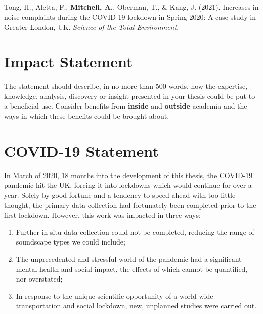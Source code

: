 \documentclass[twoside,fontsize=12pt,titlepage,chapterprefix=true
]{scrbook}
\begin{document}
\paragraph*{}Tong, H., Aletta, F., \textbf{Mitchell, A.}, Oberman, T., \& Kang, J. (2021). Increases in noise complaints during the COVID-19 lockdown in Spring 2020: A case study in Greater London, UK. \emph{Science of the Total Environment}.









\chapter*{Impact Statement}
The statement should describe, in no more than 500 words, how the expertise, knowledge, analysis, discovery or insight presented in your thesis could be put to a beneficial use. Consider benefits from \textbf{inside} and \textbf{outside} academia and the ways in which these benefits could be brought about.

\chapter*{COVID-19 Statement}

In March of 2020, 18 months into the development of this thesis, the COVID-19 pandemic hit the UK, forcing it into lockdowns which would continue for over a year. Solely by good fortune and a tendency to speed ahead with too-little thought, the primary data collection had fortunately been completed prior to the first lockdown. However, this work was impacted in three ways:

\begin{enumerate}
      \item Further in-situ data collection could not be completed, reducing the range of soundscape types we could include;
      \item The unprecedented and stressful world of the pandemic had a significant mental health and social impact, the effects of which cannot be quantified, nor overstated;
      \item In response to the unique scientific opportunity of a world-wide transportation and social lockdown, new, unplanned studies were carried out.
\end{enumerate}
\end{document}
